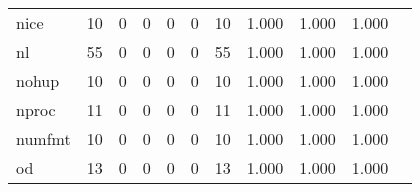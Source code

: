 \begin{longtable}{lp{1.20cm}p{1.20cm}p{1.20cm}p{1.20cm}p{1.20cm}p{1.20cm}p{1.20cm}p{1.20cm}p{1.20cm}p{1.20cm}}
nice      &                                    10 &                                                  0 &                                                  0 &                                                  0 &                                                  0 &                                                 10 &                                         1.000 &                                              1.000 &                                              1.000 \\
nl        &                                    55 &                                                  0 &                                                  0 &                                                  0 &                                                  0 &                                                 55 &                                         1.000 &                                              1.000 &                                              1.000 \\
nohup     &                                    10 &                                                  0 &                                                  0 &                                                  0 &                                                  0 &                                                 10 &                                         1.000 &                                              1.000 &                                              1.000 \\
nproc     &                                    11 &                                                  0 &                                                  0 &                                                  0 &                                                  0 &                                                 11 &                                         1.000 &                                              1.000 &                                              1.000 \\
numfmt    &                                    10 &                                                  0 &                                                  0 &                                                  0 &                                                  0 &                                                 10 &                                         1.000 &                                              1.000 &                                              1.000 \\
od        &                                    13 &                                                  0 &                                                  0 &                                                  0 &                                                  0 &                                                 13 &                                         1.000 &                                              1.000 &                                              1.000 \\

\end{longtable}
